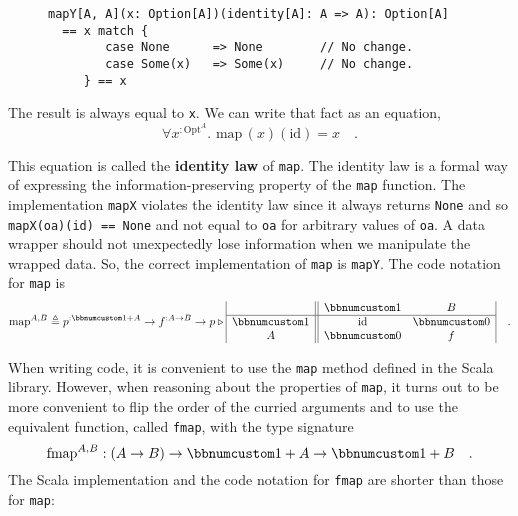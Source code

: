\begin{wrapfigure}{l}{0.58\columnwidth}%
\vspace{-0.6\baselineskip}
\begin{lstlisting}
mapY[A, A](x: Option[A])(identity[A]: A => A): Option[A]
  == x match {
        case None      => None        // No change.
        case Some(x)   => Some(x)     // No change.
     } == x
\end{lstlisting}
\vspace{0.1\baselineskip}
\end{wrapfigure}%

\noindent The result is always equal to \lstinline!x!. We can write
that fact as an equation,\vspace{-0.3\baselineskip}
\[
\forall x^{:\text{Opt}^{A}}.\,\,\text{map}\,(x)(\text{id})=x\quad.
\]
\vspace{-0.85\baselineskip}

\noindent This equation is called the \textbf{identity law}
of \lstinline!map!. The identity law is a formal way of expressing
the information-preserving property of the \lstinline!map! function.
The implementation \lstinline!mapX! violates the identity law since
it always returns \lstinline!None! and so \lstinline!mapX(oa)(id) == None!
and not equal to \lstinline!oa! for arbitrary values of \lstinline!oa!.
A data wrapper should not unexpectedly lose information when we manipulate
the wrapped data. So, the correct implementation of \lstinline!map!
is \lstinline!mapY!. The code notation for \lstinline!map! is
\[
\text{map}^{A,B}\triangleq p^{:\bbnum 1+A}\rightarrow f^{:A\rightarrow B}\rightarrow p\triangleright\begin{array}{|c||cc|}
 & \bbnum 1 & B\\
\hline \bbnum 1 & \text{id} & \bbnum 0\\
A & \bbnum 0 & f
\end{array}\quad.
\]

When writing code, it is convenient to use the \lstinline!map! method
defined in the Scala library. However, when reasoning about the properties
of \lstinline!map!, it turns out to be more convenient to flip the
order of the curried arguments and to use the equivalent function,
called \lstinline!fmap!, with the type signature
\[
\text{fmap}^{A,B}:\left(A\rightarrow B\right)\rightarrow\bbnum 1+A\rightarrow\bbnum 1+B\quad.
\]
The Scala implementation and the code notation for \lstinline!fmap!
are shorter than those for \lstinline!map!:

